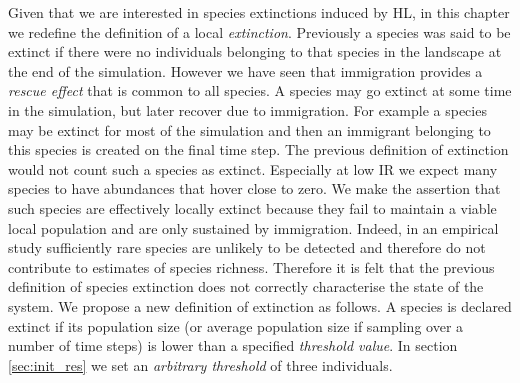 Given that we are interested in species extinctions induced by HL, in this chapter we redefine the definition of a local \emph{extinction}. Previously a species was said to be extinct if there were no individuals belonging to that species in the landscape at the end of the simulation. However we have seen that immigration provides a \emph{rescue effect} that is common to all species. A species may go extinct at some time in the simulation, but later recover due to immigration. For example a species may be extinct for most of the simulation and then an immigrant belonging to this species is created on the final time step. The previous definition of extinction would not count such a species as extinct. Especially at low IR we expect many species to have abundances that hover close to zero. We make the assertion that such species are effectively locally extinct because they fail to maintain a viable local population and are only sustained by immigration. Indeed, in an empirical study sufficiently rare species are unlikely to be detected and therefore do not contribute to estimates of species richness. Therefore it is felt that the previous definition of species extinction does not correctly characterise the state of the system. We propose a new definition of extinction as follows. A species  is declared extinct if its population size (or average population size if sampling over a number of time steps) is lower than a specified \emph{threshold value}. In section \ref{sec:init_res} we set an \emph{arbitrary threshold} of three individuals.




